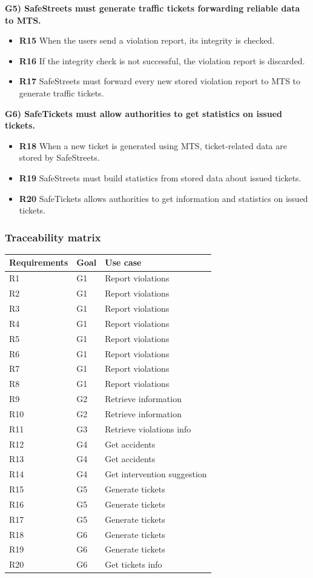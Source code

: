\documentclass[a4paper]{article}
\begin{document}
\textbf{G5) SafeStreets must generate traffic tickets forwarding
reliable data to MTS.}

\begin{itemize}
\item
  \textbf{R15} When the users send a violation report, its integrity is
  checked.
\item
  \textbf{R16} If the integrity check is not successful, the violation
  report is discarded.
\item
  \textbf{R17} SafeStreets must forward every new stored violation
  report to MTS to generate traffic tickets.
\end{itemize}

\textbf{G6) SafeTickets must allow authorities to get statistics on
issued tickets.}

\begin{itemize}
\item
  \textbf{R18} When a new ticket is generated using MTS, ticket-related
  data are stored by SafeStreets.
\item
  \textbf{R19} SafeStreets must build statistics from stored data about
  issued tickets.
\item
  \textbf{R20} SafeTickets allows authorities to get information and
  statistics on issued tickets.
\end{itemize}

\subsubsection{Traceability matrix}\label{header-n696}

\begin{table}[H]
\centering
\begin{tabular}{|l|l|l|}
\hline
Requirements & Goal & Use case\tabularnewline
\hline
R1 & G1 & Report violations\tabularnewline
R2 & G1 & Report violations\tabularnewline
R3 & G1 & Report violations\tabularnewline
R4 & G1 & Report violations\tabularnewline
R5 & G1 & Report violations\tabularnewline
R6 & G1 & Report violations\tabularnewline
R7 & G1 & Report violations\tabularnewline
R8 & G1 & Report violations\tabularnewline
R9 & G2 & Retrieve information\tabularnewline
R10 & G2 & Retrieve information\tabularnewline
R11 & G3 & Retrieve violations info\tabularnewline
R12 & G4 & Get accidents\tabularnewline
R13 & G4 & Get accidents\tabularnewline
R14 & G4 & Get intervention suggestion\tabularnewline
R15 & G5 & Generate tickets\tabularnewline
R16 & G5 & Generate tickets\tabularnewline
R17 & G5 & Generate tickets\tabularnewline
R18 & G6 & Generate tickets\tabularnewline
R19 & G6 & Generate tickets\tabularnewline
R20 & G6 & Get tickets info\tabularnewline
\hline
\end{tabular}
\end{table}
\end{document}
